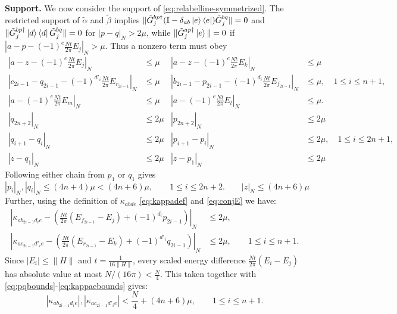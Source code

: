 \textbf{Support.} We now consider the support of \eqref{eq:relabelline-symmetrized}. The restricted support of $\tilde\alpha$ and $\tilde\beta$ implies
$\|\tilde G^{bp\dagger}_{j}(\mathbb{I} - \delta_{ab}\ket{e}\bra{e})\tilde G^{bq}_{j}\| = 0$ and
$\|\tilde G^{bp\dagger}_{j}\ket{d}\bra{d}\tilde G^{bq}_{j}\| = 0$
for $|p-q|_{N} > 2\mu$, while
$\|\tilde G^{ap \dagger}_j \ket{e}\| = 0$ if
$|a-p-(-1)^e\frac{Nt}{2\pi}E_j|_{N}>\mu$.  Thus a nonzero
term must obey
\begin{equation}
\begin{aligned}
    |a-z-(-1)^e\tfrac{Nt}{2\pi}E_j|_{N} &\leq \mu
    &|a-z-(-1)^e\tfrac{Nt}{2\pi}E_k|_{N} &\leq \mu\\
    |c_{2i-1}-q_{2i-1}-(-1)^{d'_i}\tfrac{Nt}{2\pi}E_{r_{2i-1}}|_{N} &\leq \mu
    &|b_{2i-1}-p_{2i-1}-(-1)^{d_i}\tfrac{Nt}{2\pi}E_{f_{2i-1}}|_{N} &\leq \mu,
    \quad 1\leq i\leq n+1,\\
    |a-(-1)^{e}\tfrac{Nt}{2\pi}E_m|_{N} &\leq \mu
    &|a-(-1)^{e}\tfrac{Nt}{2\pi}E_l|_{N}& \leq \mu.\\
        |q_{2n+2}|_{N} &\leq 2\mu & |p_{2n+2}|_{N} &\leq 2\mu\\
    |q_{i+1}-q_i|_{N} &\leq 2\mu
    &|p_{i+1}-p_i|_{N} &\leq 2\mu,\quad 1\leq i\leq2n+1,\\
    |z-q_1|_{N} &\leq 2\mu & |z-p_1|_{N} &\leq 2\mu
\end{aligned}
\label{eq:conjE}
\end{equation}
Following either chain from $p_1$ or $q_1$ gives
\begin{equation}
    |p_i|_{N},|q_i|_{N} \leq (4n+4)\mu < (4n+6)\mu,
    \qquad 1\leq i\leq 2n+2. \qquad |z|_{N} \leq (4n+6)\mu
    \label{eq:pqbounds}
\end{equation}
Further, using the definition of $\kappa_{abde}$ \eqref{eq:kappadef} and \eqref{eq:conjE} we have:
\begin{align}
    \left|\kappa_{ab_{2i-1}d_i e}-\left(\tfrac{Nt}{2\pi}(E_{f_{2i-1}}-E_j)+(-1)^{d_i}p_{2i-1}\right)\right|_{N}&\leq 2\mu,\\
    \left|\kappa_{ac_{2i-1}d'_i e}-\left(\tfrac{Nt}{2\pi}(E_{r_{2i-1}}-E_k)+(-1)^{d'_i}q_{2i-1}\right)\right|_{N}&\leq 2\mu,
    \qquad 1\leq i\leq n+1.
    \label{eq:kappaebounds}
\end{align}
Since $|E_i|\leq\|H\|$ and $t=\frac{1}{16\|H\|}$, every scaled energy difference $\frac{Nt}{2\pi}(E_i - E_j)$ has absolute value at most $N/(16\pi)<\frac{N}{4}$. This taken together with \eqref{eq:pqbounds}-\eqref{eq:kappaebounds} gives:
\begin{equation}
    |\kappa_{ab_{2i-1}d_i e}|,|\kappa_{ac_{2i-1}d'_i e}| < \frac{N}{4}+(4n+6)\mu,
    \qquad 1\leq i\leq n+1.
    \label{eq:Qkappabound}
\end{equation}
